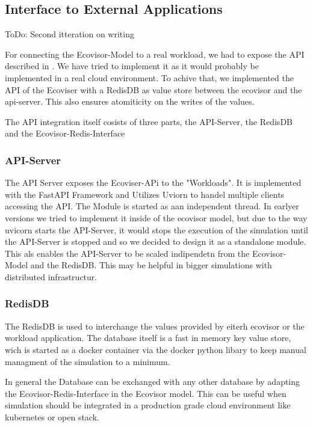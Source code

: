 \subsection{Interface to External Applications}
ToDo: Second itteration on writing

For connecting the Ecovisor-Model to a real workload, we had to expose the API described in \cite{souza2023}. We have tried to implement it as it would probably be implemented in a real cloud environment. %
To achive that, we implemented the API of the Ecoviser with a RedisDB as value store between the ecovisor and the api-server. This also ensures atomiticity on the writes of the values. %

The API integration itself cosists of three parts, the API-Server, the RedisDB and the Ecovisor-Redis-Interface



\subsubsection{API-Server}
The API Server exposes the Ecoviser-APi to the "Workloads". It is implemented with the FastAPI Framework and Utilizes Uviorn to handel multiple clients accessing the API.
The Module is started as aan independent thread. In earlyer versions we tried to implement it inside of the ecovisor model, but due to the way uvicorn starts the API-Server,
it would stops the execution of the simulation until the API-Server is stopped and so we decided to design it as a standalone module. This als enables the API-Server to be scaled indipendetn from
the Ecovisor-Model and the RedisDB. This may be helpful in bigger simulations with distributed infrastructur. 


\subsubsection{RedisDB}
The RedisDB is used to interchange the values provided by eiterh ecovisor or the workload application. The database itself is a fast in memory key value store, wich is started as a docker container via the docker python libary %
to keep manual managment of the simulation to a minimum.

In general the Database can be exchanged with any other database by adapting the Ecovisor-Redis-Interface in the Ecovisor model. This can be useful when simulation should be integrated 
in a production grade cloud environment like kubernetes or open stack.

